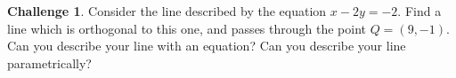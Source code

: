 \documentclass{tufte-book}
\theoremstyle{definition}
\newtheorem{challenge}[task]{Challenge}
\begin{document}
\begin{challenge}
Consider the line described by the equation $x -2y = -2$. Find a line which is orthogonal to this one, and passes through the point $Q=(9,-1)$. Can you describe your line with an equation? Can you describe your line parametrically?
\end{challenge}




%
%
\end{document}
